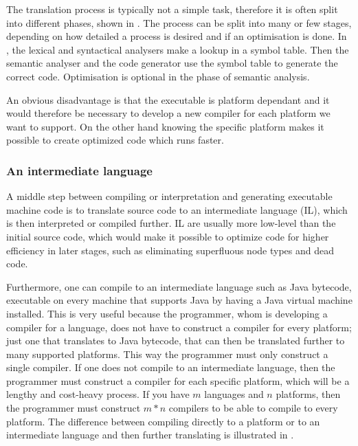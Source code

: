 The translation process is typically not a simple task,
therefore it is often split into different phases, shown in
. The process can be split into many or
few stages, depending on how detailed a process is desired and if an
optimisation is done. In , the lexical and
syntactical analysers make a lookup in a symbol table. Then the semantic
analyser and the code generator use the symbol table to generate
the correct code. Optimisation is optional in the phase of semantic
analysis. \cite[p. 46]{sebesta2013}



An obvious disadvantage is that the executable is platform dependant
and it would therefore be necessary to develop a new compiler for each
platform we want to support. On the other hand knowing the specific
platform makes it possible to create optimized code which runs faster.

\subsubsection{An intermediate language}
\label{sec:intermediatelanguage}
A middle step between compiling or interpretation and generating executable
machine code is to translate source code to an intermediate language (IL), which
is then interpreted or compiled further. IL are usually more low-level than the
initial source code, which would make it possible to optimize code for higher
efficiency in later stages, such as eliminating superfluous node types and dead
code.

Furthermore, one can compile to an intermediate language such as Java bytecode,
executable on every machine that supports Java by having a Java virtual machine
installed. This is very useful because the programmer, whom is developing a
compiler for a language, does not have to construct a compiler for every
platform; just one that translates to Java bytecode, that can then be translated
further to many supported platforms. This way the programmer must only construct a
single compiler. If one does not compile to an intermediate language, then the
programmer must construct a compiler for each specific platform, which will be a
lengthy and cost-heavy process. If you have $m$ languages and $n$ platforms,
then the programmer must construct $m*n$ compilers to be able to compile to
every platform. The difference between compiling directly to a platform or to an
intermediate language and then further translating is illustrated in
.

